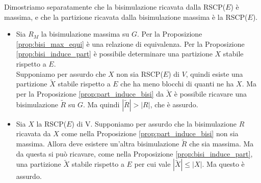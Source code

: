 \begin{proof2}
    Dimostriamo separatamente che la bisimulazione ricavata dalla RSCP($E$) è massima, e che la partizione ricavata dalla bisimulazione massima è la RSCP($E$).
    \begin{itemize}
        \item Sia $R_M$ la bisimulazione massima su $G$. Per la Proposizione \ref{prop:bisi_max_equi} è una relazione di equivalenza. Per la Proposizione \ref{prop:bisi_induce_part} è possibile determinare una partizione $X$ stabile rispetto a $E$.\\
              Supponiamo per assurdo che $X$ non sia RSCP($E$) di $V$, quindi esiste una partizione $\widetilde{X}$ stabile rispetto a $E$ che ha meno blocchi di quanti ne ha $X$. Ma per la Proposizione \ref{prop:part_induce_bisi} da
              $\widetilde{X}$ è possibile ricavare una bisimulazione $\widetilde{R}$ su $G$. Ma quindi $|\widetilde{R}| > |R|$, che è assurdo.
        \item Sia $X$ la RSCP($E$) di V. Supponiamo per assurdo che la bisimulazione $R$ ricavata da $X$ come nella Proposizione \ref{prop:part_induce_bisi} non sia massima. Allora deve esistere un'altra bisimulazione $\widetilde{R}$ che
              sia massima. Ma da questa si può ricavare, come nella Proposizione \ref{prop:bisi_induce_part}, una partizione $\widetilde{X}$ stabile rispetto a $E$ per cui vale $|\widetilde{X}| \leq |X|$. Ma questo è assurdo.
    \end{itemize}
    \vspace*{-0.75cm}
\end{proof2}
